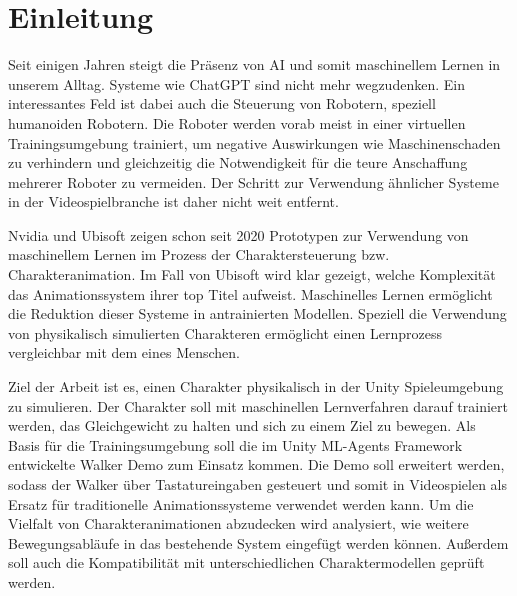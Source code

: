 \chapter{Einleitung}
\label{sec:einleitung}
Seit einigen Jahren steigt die Präsenz von AI und somit maschinellem Lernen in unserem Alltag. Systeme wie ChatGPT sind nicht mehr wegzudenken. Ein interessantes Feld ist dabei auch die Steuerung von Robotern, speziell humanoiden Robotern. Die Roboter werden vorab meist in einer virtuellen Trainingsumgebung trainiert, um negative Auswirkungen wie Maschinenschaden zu verhindern und gleichzeitig die Notwendigkeit für die teure Anschaffung mehrerer Roboter zu vermeiden. Der Schritt zur Verwendung ähnlicher Systeme in der Videospielbranche ist daher nicht weit entfernt.

Nvidia und Ubisoft zeigen schon seit 2020 Prototypen zur Verwendung von maschinellem Lernen im Prozess der Charaktersteuerung bzw. Charakteranimation.\cite{2022-TOG-ASE}\cite{10.1145/3355089.3356536} Im Fall von Ubisoft wird klar gezeigt, welche Komplexität das Animationssystem ihrer top Titel aufweist. Maschinelles Lernen ermöglicht die Reduktion dieser Systeme in antrainierten Modellen. Speziell die Verwendung von physikalisch simulierten Charakteren ermöglicht einen Lernprozess vergleichbar mit dem eines Menschen.

Ziel der Arbeit ist es, einen Charakter physikalisch in der Unity Spieleumgebung zu simulieren. Der Charakter soll mit maschinellen Lernverfahren darauf trainiert werden, das Gleichgewicht zu halten und sich zu einem Ziel zu bewegen. Als Basis für die Trainingsumgebung soll die im Unity ML-Agents Framework entwickelte Walker Demo zum Einsatz kommen. Die Demo soll erweitert werden, sodass der Walker über Tastatureingaben gesteuert und somit in Videospielen als Ersatz für traditionelle Animationssysteme verwendet werden kann. Um die Vielfalt von Charakteranimationen abzudecken wird analysiert, wie weitere Bewegungsabläufe in das bestehende System eingefügt werden können. Außerdem soll auch die Kompatibilität mit unterschiedlichen Charaktermodellen geprüft werden.

